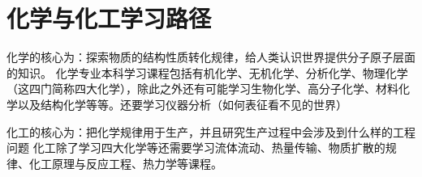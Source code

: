 \section{化学与化工学习路径}

化学的核心为：探索物质的结构性质转化规律，给人类认识世界提供分子原子层面的知识。
化学专业本科学习课程包括有机化学、无机化学、分析化学、物理化学（这四门简称四大化学），除此之外还有可能学习生物化学、高分子化学、材料化学以及结构化学等等。还要学习仪器分析（如何表征看不见的世界）

化工的核心为：把化学规律用于生产，并且研究生产过程中会涉及到什么样的工程问题
化工除了学习四大化学等还需要学习流体流动、热量传输、物质扩散的规律、化工原理与反应工程、热力学等课程。

\subsubsection{}
